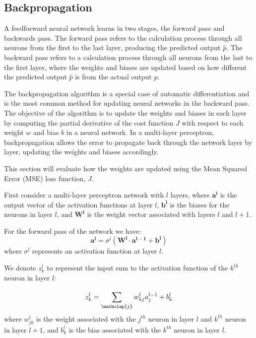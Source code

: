         \subsection{Backpropagation} \label{backprop}
            A feedforward neural network learns in two stages, the forward pass and backwards pass. The forward pass refers to the calculation process through all neurons from the first to the last layer, producing the predicted output $\hat{p}$. The backward pass refers to a calculation process through all neurons from the last to the first layer, where the weights and biases are updated based on how different the predicted output $\hat{p}$ is from the actual output $p$.
            
            The backpropagation algorithm is a special case of automatic differentiation and is the most common method for updating neural networks in the backward pass. The objective of the algorithm is to update the weights and biases in each layer by computing the partial derivative of the cost function $J$ with respect to each weight $w$ and bias $b$ in a neural network. In a multi-layer perceptron, backpropagation allows the error to propagate back through the network layer by layer, updating the weights and biases accordingly. 

            This section will evaluate how the weights are updated using the Mean Squared Error (MSE) loss function,  $J$. 
            
            First consider a multi-layer perceptron network with $l$ layers, where $\boldsymbol{a^l}$ is the output vector of the activation functions at layer $l$, $\boldsymbol{b^l}$ is the biases for the neurons in layer $l$, and $\boldsymbol{W^l}$ is the weight vector associated with layers $l$ and $l+1$.
            
            For the forward pass of the network we have: 
            \begin{equation} \label{backpropagation_formula}
                \boldsymbol{a^l} = \sigma^{l}{ (\boldsymbol{W^l} \cdot \boldsymbol{a^{l-1}} +  \boldsymbol{b^l})  }
            \end{equation}
            where $\sigma^{l}$ represents an activation function at layer $l$. 
            
            We denote $z^{l}_{k}$ to represent the input sum to the activation function of the $k^{th}$ neuron in layer $l$:
            
            \begin{equation} \label{input_sum_neuron2}
                z^{l}_{k} = \sum_{\mathclap{j}}^{} w^{l}_{kj} a^{l-1}_{j} + b^{l}_{k}
            \end{equation}
            where $w^{l}_{jk}$ is the weight associated with the $j^{th}$ neuron in layer $l$ and $k^{th}$ neuron in layer $l + 1$, and $b^{l}_{k}$ is the bias associated with the $k^{th}$ neuron in layer $l$. 
            

